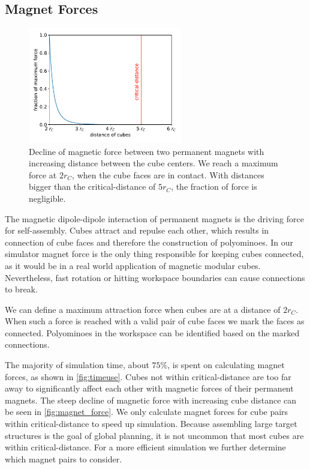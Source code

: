 \subsection{Magnet Forces}
\label{sec:force_magnet}

\begin{figure}
	\centering
	\includegraphics[width=0.6\textwidth]{figures/plots/magnet_force.pdf}
	\caption[Declining magnetic force with increasing cube distance]{Decline of magnetic force between two permanent magnets with increasing distance between the cube centers. We reach a maximum force at $2 r_C$, when the cube faces are in contact. With distances bigger than the critical-distance of $5 r_C$, the fraction of force is negligible.}
	\label{fig:magnet_force}
\end{figure}

The magnetic dipole-dipole interaction of permanent magnets is the driving force for self-assembly.
Cubes attract and repulse each other, which results in connection of cube faces and therefore the construction of polyominoes.
In our simulator magnet force is the only thing responsible for keeping cubes connected, as it would be in a real world application of magnetic modular cubes.
Nevertheless, fast rotation or hitting workspace boundaries can cause connections to break.

We can define a maximum attraction force when cubes are at a distance of $2 r_C$.
When such a force is reached with a valid pair of cube faces we mark the faces as connected.
Polyominoes in the workspace can be identified based on the marked connections.

The majority of simulation time, about $75\%$, is spent on calculating magnet forces, as shown in \autoref{fig:timeuse}.
Cubes not within critical-distance are too far away to significantly affect each other with magnetic forces of their permanent magnets.
The steep decline of magnetic force with increasing cube distance can be seen in \autoref{fig:magnet_force}.
We only calculate magnet forces for cube pairs within critical-distance to speed up simulation.
Because assembling large target structures is the goal of global planning, it is not uncommon that most cubes are within critical-distance.
For a more efficient simulation we further determine which magnet pairs to consider.

